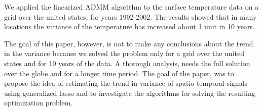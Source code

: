 \documentclass{article}
\begin{document}
We applied the linearized ADMM algorithm to the surface temperature data on a grid over the united states, for years 1992-2002. The results showed that in many locations the variance of the temperature has increased about 1 unit in 10 years.

The goal of this paper, however, is not to make any conclusions about the trend in the variance because we solved the problem only for a grid over the united states and for 10 years of the data. A thorough analysis, needs the full solution over the globe and for a longer time period. The goal of the paper, was to propose the idea of estimating the trend in variance of spatio-temporal signals using generalized lasso and to investigate the algorithms for solving the resulting optimization problem.



\small

\end{document}
